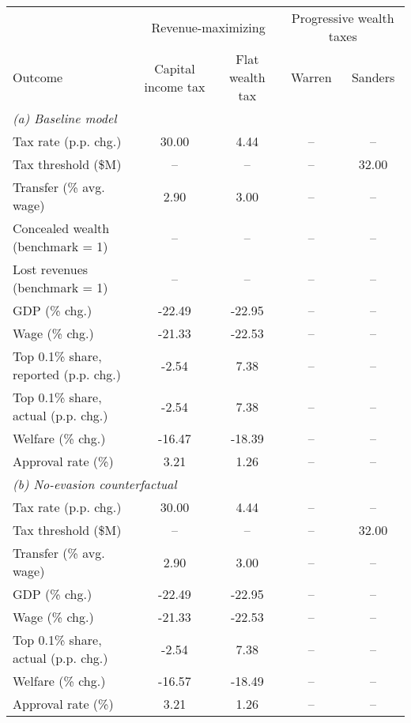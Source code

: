 \footnotesize
\renewcommand{\arraystretch}{1.2}
\begin{tabular}{lcccc}
\toprule
&\multicolumn{2}{c}{Revenue-maximizing} & \multicolumn{2}{c}{Progressive wealth taxes}\\
\cmidrule(rl){2-3}\cmidrule(rl){4-5}
Outcome & Capital income tax & Flat wealth tax & Warren & Sanders\\
\midrule
\multicolumn{5}{l}{\textit{(a) Baseline model}}\\
Tax rate (p.p. chg.)&30.00&4.44&--&--\\
Tax threshold (\$M)&--&--&--&32.00\\
Transfer (\% avg. wage)&2.90&3.00&--&--\\
[1.0ex]Concealed wealth (benchmark = 1)&--&--&--&--\\
Lost revenues (benchmark = 1)&--&--&--&--\\
[1.0ex]GDP (\% chg.)&-22.49&-22.95&--&--\\
Wage (\% chg.)&-21.33&-22.53&--&--\\
[1.0ex]Top 0.1\% share, reported (p.p. chg.)&-2.54&7.38&--&--\\
Top 0.1\% share, actual (p.p. chg.)&-2.54&7.38&--&--\\
[1.0ex]Welfare (\% chg.)&-16.47&-18.39&--&--\\
Approval rate (\%)&3.21&1.26&--&--\\
\midrule
\multicolumn{5}{l}{\textit{(b) No-evasion counterfactual}}\\
Tax rate (p.p. chg.)&30.00&4.44&--&--\\
Tax threshold (\$M)&--&--&--&32.00\\
Transfer (\% avg. wage)&2.90&3.00&--&--\\
[1.0ex]GDP (\% chg.)&-22.49&-22.95&--&--\\
Wage (\% chg.)&-21.33&-22.53&--&--\\
[1.0ex]Top 0.1\% share, actual (p.p. chg.)&-2.54&7.38&--&--\\
[1.0ex]Welfare (\% chg.)&-16.57&-18.49&--&--\\
Approval rate (\%)&3.21&1.26&--&--\\
\bottomrule
\end{tabular}
\normalsize
